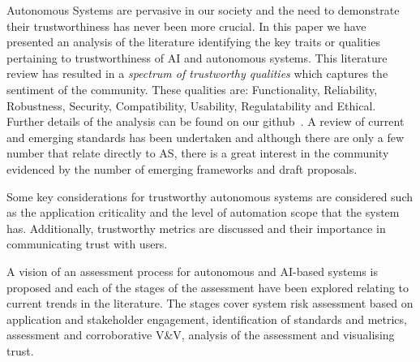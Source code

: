 Autonomous Systems are pervasive in our society and the need to demonstrate their trustworthiness has never been more crucial. 
%
In this paper we have presented an analysis of the literature identifying the key traits or qualities pertaining to trustworthiness of AI and autonomous systems. This literature review has resulted in a \emph{spectrum of trustworthy qualities} which captures the sentiment of the community. These qualities are: Functionality, Reliability, Robustness, Security, Compatibility, Usability, Regulatability and Ethical. Further details of the analysis can be found on our github~\cite{tsl_git}. 
%
A review of current and emerging standards has been undertaken and although there are only a few number that relate directly to AS, there is a great interest in the community evidenced by the number of emerging frameworks and draft proposals. 

Some key considerations for trustworthy autonomous systems are considered such as the application criticality and the level of automation scope that the system has. Additionally, trustworthy metrics are discussed and their importance in communicating trust with users.

A vision of an assessment process for autonomous and AI-based systems is proposed and each of the stages of the assessment have been explored relating to current trends in the literature. The stages cover system risk assessment based on application and stakeholder engagement, identification of standards and metrics, assessment and corroborative V\&V, analysis of the assessment and visualising trust.

